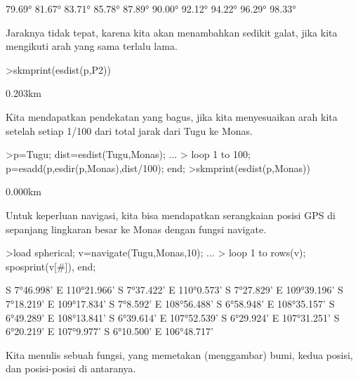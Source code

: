 \documentclass{article}
\newenvironment{eulernotebook}{\par}{\par}
\newenvironment{eulercomment}{\par\medskip}{\par\medskip}
\begin{document}
\begin{eulernotebook}
\begin{eulercomment}
\begin{eulercomment}
\begin{eulercomment}
\begin{eulercomment}
\begin{eulerprompt}
\end{eulerprompt}
\begin{euleroutput}
       79.69°
       81.67°
       83.71°
       85.78°
       87.89°
       90.00°
       92.12°
       94.22°
       96.29°
       98.33°
\end{euleroutput}
\begin{eulercomment}
Jaraknya tidak tepat, karena kita akan menambahkan sedikit galat, jika
kita mengikuti arah yang sama terlalu lama.
\end{eulercomment}
\begin{eulerprompt}
>skmprint(esdist(p,P2))
\end{eulerprompt}
\begin{euleroutput}
       0.203km
\end{euleroutput}
\begin{eulercomment}
Kita mendapatkan pendekatan yang bagus, jika kita menyesuaikan arah
kita setelah setiap 1/100 dari total jarak dari Tugu ke Monas.
\end{eulercomment}
\begin{eulerprompt}
>p=Tugu; dist=esdist(Tugu,Monas); ...
>  loop 1 to 100; p=esadd(p,esdir(p,Monas),dist/100); end;
>skmprint(esdist(p,Monas))
\end{eulerprompt}
\begin{euleroutput}
       0.000km
\end{euleroutput}
\begin{eulercomment}
Untuk keperluan navigasi, kita bisa mendapatkan serangkaian posisi GPS
di sepanjang lingkaran besar ke Monas dengan fungsi navigate.
\end{eulercomment}
\begin{eulerprompt}
>load spherical; v=navigate(Tugu,Monas,10); ...
>  loop 1 to rows(v); sposprint(v[#]), end;
\end{eulerprompt}
\begin{euleroutput}
  S 7°46.998' E 110°21.966'
  S 7°37.422' E 110°0.573'
  S 7°27.829' E 109°39.196'
  S 7°18.219' E 109°17.834'
  S 7°8.592' E 108°56.488'
  S 6°58.948' E 108°35.157'
  S 6°49.289' E 108°13.841'
  S 6°39.614' E 107°52.539'
  S 6°29.924' E 107°31.251'
  S 6°20.219' E 107°9.977'
  S 6°10.500' E 106°48.717'
\end{euleroutput}
\begin{eulercomment}
Kita menulis sebuah fungsi, yang memetakan (menggambar) bumi, kedua
posisi, dan posisi-posisi di antaranya.
\end{eulercomment}
\begin{eulerprompt}

\end{eulerprompt}
\end{eulercomment}
\end{eulercomment}
\end{eulercomment}
\end{eulercomment}
\end{eulernotebook}
\end{document}

